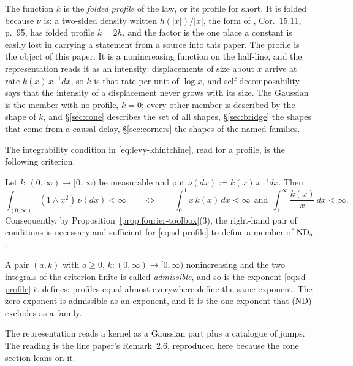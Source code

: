 The function $k$ is the \emph{folded profile} of the law, or its profile for short. It is
folded because $\nu$ is: a two-sided \Levy{} density written $h(|x|)/|x|$, the form of
, Cor.~15.11, p.~95, has folded profile $k = 2h$, and the factor is the
one place a
constant is easily lost in carrying a statement from a source into this paper. The profile
is the object of this paper. It is a nonincreasing function on the half-line, and the
representation reads it as an intensity: displacements of size about $x$ arrive at rate
$k(x)\,x^{-1}dx$, so $k$ is that rate per unit of $\log x$, and self-decomposability says
that the intensity of a displacement never grows with its size. The Gaussian is the member
with no profile, $k = 0$; every other member is described by the shape of $k$, and
\S\ref{sec:cone} describes the set of all shapes, \S\ref{sec:bridge} the shapes that come
from a causal delay, \S\ref{sec:corners} the shapes of the named families.

The integrability condition in \ref{eq:levy-khintchine}, read for a profile, is the following
criterion.

\begin{lemma}\label{lem:profile-integrability}
Let $k : (0,\infty) \to [0,\infty)$ be measurable and put $\nu(dx) := k(x)\,x^{-1}dx$. Then
\[
  \int_{(0,\infty)} (1 \wedge x^2)\,\nu(dx) < \infty
  \qquad\Longleftrightarrow\qquad
  \int_0^1 x\,k(x)\,dx < \infty \ \ \text{and} \ \
  \int_1^\infty \frac{k(x)}{x}\,dx < \infty .
\]
Consequently, by Proposition~\ref{prop:fourier-toolbox}(3), the right-hand pair of conditions
is necessary and sufficient for \ref{eq:sd-profile} to define a member of $\mathrm{ND}_{\mathrm{s}}$.
\end{lemma}

A pair $(a,k)$ with $a \ge 0$, $k : (0,\infty) \to [0,\infty)$ nonincreasing and the two
integrals of the criterion finite is called \emph{admissible}, and so is the exponent
\ref{eq:sd-profile} it defines; profiles equal almost everywhere define the same exponent.
The zero exponent is admissible as an exponent, and it is the one exponent that (ND) excludes
as a family.

The representation reads a kernel as a Gaussian part plus a catalogue of jumps. The reading is
the line paper's Remark~2.6, reproduced here because the cone section leans on it.

